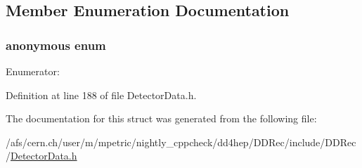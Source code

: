 \subsection{Member Enumeration Documentation}
\hypertarget{struct_d_d4hep_1_1_d_d_rec_1_1_z_disk_petals_struct_1_1_sensor_type_a7adf005f92ce26633f914a97d759d32d}{
\subsubsection[{"@19}]{\setlength{\rightskip}{0pt plus 5cm}anonymous enum}}
\label{struct_d_d4hep_1_1_d_d_rec_1_1_z_disk_petals_struct_1_1_sensor_type_a7adf005f92ce26633f914a97d759d32d}
\begin{Desc}
\item[Enumerator: ]\par
\begin{description}
\item[{\em 
\hypertarget{struct_d_d4hep_1_1_d_d_rec_1_1_z_disk_petals_struct_1_1_sensor_type_a7adf005f92ce26633f914a97d759d32dad987a4969ad80712a640e43136b96578}{
DoubleSided}
\label{struct_d_d4hep_1_1_d_d_rec_1_1_z_disk_petals_struct_1_1_sensor_type_a7adf005f92ce26633f914a97d759d32dad987a4969ad80712a640e43136b96578}
}]\item[{\em 
\hypertarget{struct_d_d4hep_1_1_d_d_rec_1_1_z_disk_petals_struct_1_1_sensor_type_a7adf005f92ce26633f914a97d759d32da73fc4b655f1930a5283de453c1dc406f}{
Pixel}
\label{struct_d_d4hep_1_1_d_d_rec_1_1_z_disk_petals_struct_1_1_sensor_type_a7adf005f92ce26633f914a97d759d32da73fc4b655f1930a5283de453c1dc406f}
}]\end{description}
\end{Desc}



Definition at line 188 of file DetectorData.h.

The documentation for this struct was generated from the following file:\begin{DoxyCompactItemize}
\item 
/afs/cern.ch/user/m/mpetric/nightly\_\-cppcheck/dd4hep/DDRec/include/DDRec/\hyperlink{_detector_data_8h}{DetectorData.h}\end{DoxyCompactItemize}
